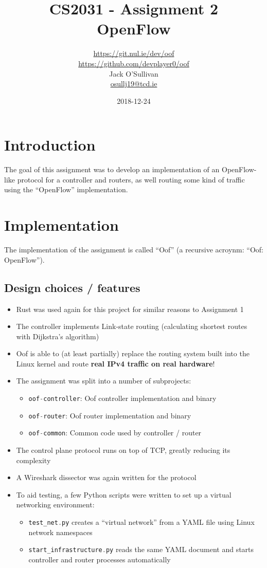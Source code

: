 \documentclass[a4paper]{article}
\title{CS2031 - Assignment 2\\OpenFlow}
\date{2018-12-24}
\author{\url{https://git.nul.ie/dev/oof}\\\url{https://github.com/devplayer0/oof}\\Jack O'Sullivan\\\href{mailto:osullj19@tcd.ie}{osullj19@tcd.ie}}
\numberwithin{figure}{section}
\numberwithin{table}{section}
\newcommand{\mi}{\mintinline}
\begin{document}
\maketitle
\tableofcontents
{}

\newpage
{}
\section{Introduction}
The goal of this assignment was to develop an implementation of an OpenFlow-like protocol for a controller and routers, as well routing some kind of traffic using the ``OpenFlow'' implementation.

\section{Implementation}
The implementation of the assignment is called ``Oof'' (a recursive acroynm: ``Oof: OpenFlow'').
\subsection{Design choices / features}
\begin{itemize}
	\item Rust was used again for this project for similar reasons to Assignment 1
	\item The controller implements Link-state routing (calculating shortest routes with Dijkstra's algorithm)
	\item Oof is able to (at least partially) replace the routing system built into the Linux kernel and route \textbf{real IPv4 traffic on real hardware}!
	\item The assignment was split into a number of subprojects:
		\begin{itemize}
			\item \mi{c}{oof-controller}: Oof controller implementation and binary
			\item \mi{c}{oof-router}: Oof router implementation and binary
			\item \mi{c}{oof-common}: Common code used by controller / router
		\end{itemize}
	\item The control plane protocol runs on top of TCP, greatly reducing its complexity
	\item A Wireshark dissector was again written for the protocol
	\item To aid testing, a few Python scripts were written to set up a virtual networking environment:
		\begin{itemize}
			\item \mi{c}{test_net.py} creates a ``virtual network'' from a YAML file using Linux network namespaces
			\item \mi{c}{start_infrastructure.py} reads the same YAML document and starts controller and router processes automatically
		\end{itemize}
\end{itemize}
\end{document}
